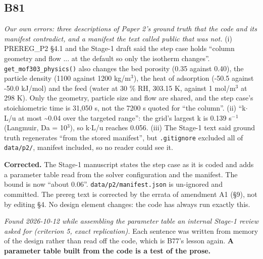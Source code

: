 \documentclass[10pt]{article}
\begin{document}
\subsection*{B81}\label{led:B81}
\begin{description}[leftmargin=0pt,itemsep=1pt]
\item[Defect.] \emph{Our own errors: three descriptions of Paper 2's ground truth that the code and its manifest contradict, and a manifest the text called public that was not.} (i) PREREG\_P2 §4.1 and the Stage-1 draft said the step case holds ``column geometry and flow ... at the default so only the isotherm changes''. \texttt{get\_mof303\_physics()} also changes the bed porosity (0.35 against 0.40), the particle density (1100 against 1200 kg/m$^3$), the heat of adsorption (-50.5 against -50.0 kJ/mol) and the feed (water at 30 \% RH, 303.15 K, against 1 mol/m$^3$ at 298 K). Only the geometry, particle size and flow are shared, and the step case's stoichiometric time is 31,050 s, not the 7200 s quoted for ``the column''. (ii) ``k$\cdot$L/u at most \textasciitilde{}0.04 over the targeted range'': the grid's largest k is 0.139 s$^{-}$$^1$ (Langmuir, Da = 10$^3$), so k$\cdot$L/u reaches 0.056. (iii) The Stage-1 text said ground truth regenerates ``from the stored manifest'', but \texttt{.gitignore} excluded all of \texttt{data/p2/}, manifest included, so no reader could see it.
\item[Resolution.] \textbf{Corrected.} The Stage-1 manuscript states the step case as it is coded and adds a parameter table read from the solver configuration and the manifest. The bound is now ``about 0.06''. \texttt{data/p2/manifest.json} is un-ignored and committed. The prereg text is corrected by the errata of amendment A1 (§9), not by editing §4. No design element changes: the code has always run exactly this.
\item[Note.] \emph{Found 2026-10-12 while assembling the parameter table an internal Stage-1 review asked for (criterion 5, exact replication).} Each sentence was written from memory of the design rather than read off the code, which is B77's lesson again. \textbf{A parameter table built from the code is a test of the prose.}
\end{description}
\end{document}
